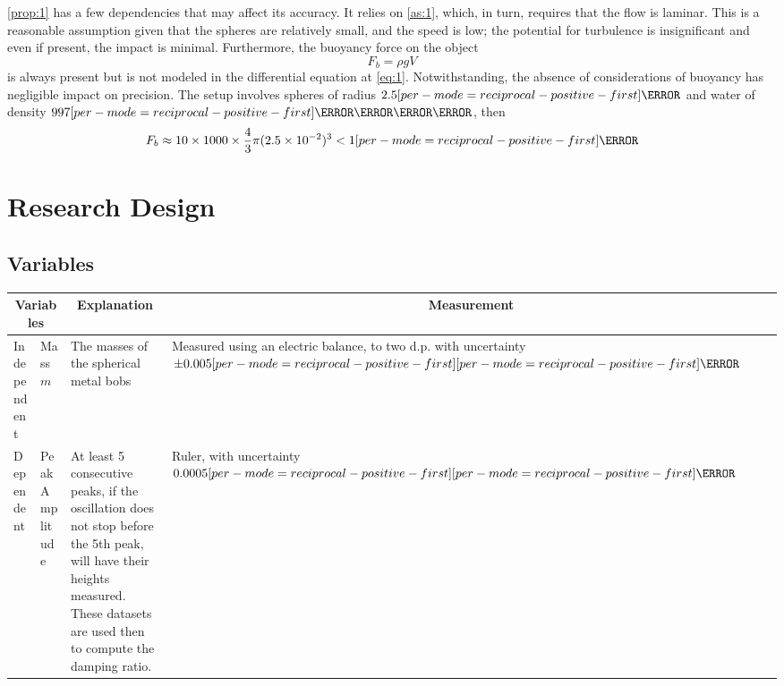 \documentclass[a4paper,12pt]{article}
\let\oldsi\si
\renewcommand{\si}[1]{\oldsi[per-mode=reciprocal-positive-first]{#1}}
\begin{document}
\cref{prop:1} has a few dependencies that may affect its accuracy. It relies on \cref{as:1}, which, in turn, requires that the flow is laminar. This is a reasonable assumption given that the spheres are relatively small, and the speed is low; the potential for turbulence is insignificant and even if present, the impact is minimal. Furthermore, the buoyancy force on the object
$$F_b = \rho g V$$
is always present but is not modeled in the differential equation at \cref{eq:1}. Notwithstanding, the absence of considerations of buoyancy has negligible impact on precision. The setup involves spheres of radius $2.5\si{\cm}$ and water of density $997\si{\kg\per\m\cubed}$, then
$$F_b \approx 10 \times 1000 \times \frac{4}{3}\pi (2.5\times 10^{-2})^3 < 1\si{\N}$$
\pagebreak

\section{Research Design}

\subsection{Variables}
\begin{center}
  \begin{tabular}{|p{}|p{}|p{}|p{}|}
    \hline
    \multicolumn{2}{|c}{Variables} & \multicolumn{1}{|c}{Explanation} & \multicolumn{1}{|c|}{Measurement}                                                                                                                                                                                                                                       \\  \hline
    Independent                    & Mass $m$                         & The masses of the spherical metal bobs                                                                                                                                           & Measured using an electric balance, to two d.p. with uncertainty $\pm 0.005 \si{\g}$ \\
    \hline
    Dependent                      & Peak Amplitude                   & At least 5 consecutive peaks, if the oscillation does not stop before the 5th peak, will have their heights measured. These datasets are used then to compute the damping ratio. & Ruler, with uncertainty $0.0005\si{\m}$                                              \\
    \hline
  \end{tabular}
  \label{tab:1}
\end{center}
\end{document}
